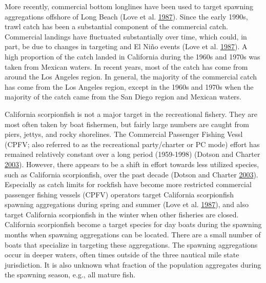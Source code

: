 \documentclass[12pt,]{article}
\begin{document}
More recently, commercial bottom longlines have been used to target
spawning aggregations offshore of Long Beach (Love et al.
\protect\hyperlink{ref-Love1987}{1987}). Since the early 1990s, trawl
catch has been a substantial component of the commercial catch.
Commercial landings have fluctuated substantially over time, which
could, in part, be due to changes in targeting and El Niño events (Love
et al. \protect\hyperlink{ref-Love1987}{1987}). A high proportion of the
catch landed in California during the 1960s and 1970s was taken from
Mexican waters. In recent years, most of the catch has come from around
the Los Angeles region. In general, the majority of the commercial catch
has come from the Los Angeles region, except in the 1960s and 1970s when
the majority of the catch came from the San Diego region and Mexican
waters.

California scorpionfish is not a major target in the recreational
fishery. They are most often taken by boat fishermen, but fairly large
numbers are caught from piers, jettys, and rocky shorelines. The
Commercial Passenger Fishing Vessl (CPFV; also referred to as the
recreational party/charter or PC mode) effort has remained relatively
constant over a long period (1959-1998) (Dotson and Charter
\protect\hyperlink{ref-Dotson2003}{2003}). However, there appears to be
a shift in effort towards less utilized species, such as California
scorpionfish, over the past decade (Dotson and Charter
\protect\hyperlink{ref-Dotson2003}{2003}). Especially as catch limits
for rockfish have become more restricted commercial passenger fishing
vessels (CPFV) operators target California scorpionfish spawning
aggregations during spring and summer (Love et al.
\protect\hyperlink{ref-Love1987}{1987}), and also target California
scorpionfish in the winter when other fisheries are closed.\\
California scorpionfish become a target species for day boats during the
spawning months when spawning aggregations can be located. There are a
small number of boats that specialize in targeting these aggregations.
The spawning aggregations occur in deeper waters, often times outside of
the three nautical mile state jurisdiction. It is also unknown what
fraction of the population aggregates during the spawning season, e.g.,
all mature fish.
\end{document}
